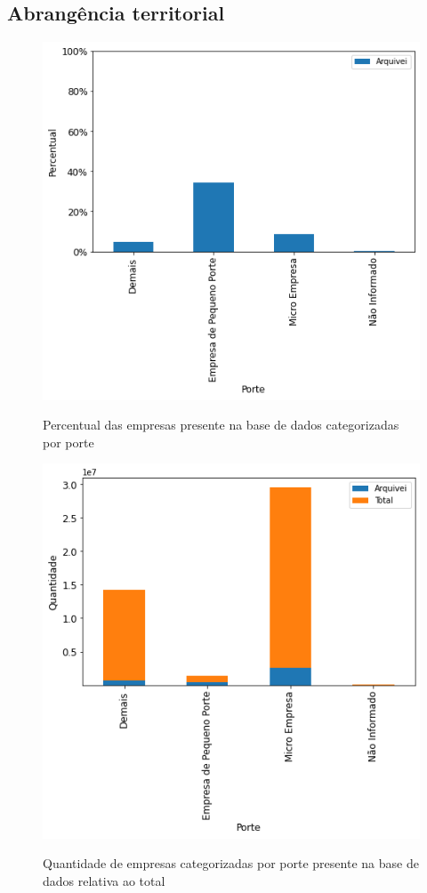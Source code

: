 \subsection{Abrangência territorial}

\begin{figure}[htb]
    \centering
    \caption{Percentual das empresas presente na base de dados categorizadas por porte}
    \includegraphics[scale=0.7]{images/base-de-dados-4.1-presenca-por-porte.png}
    \label{fig:base-de-dados:descritiva-4.1-presenca-por-porte}
    \fautor
\end{figure}

\begin{figure}[htb]
    \centering
    \caption{Quantidade de empresas categorizadas por porte presente na base de dados relativa ao total}
    \includegraphics[scale=0.7]{images/base-de-dados-4.2-qtde-por-porte.png}
    \label{fig:base-de-dados:descritiva-4.2-qtde-por-porte}
    \fautor
\end{figure}

